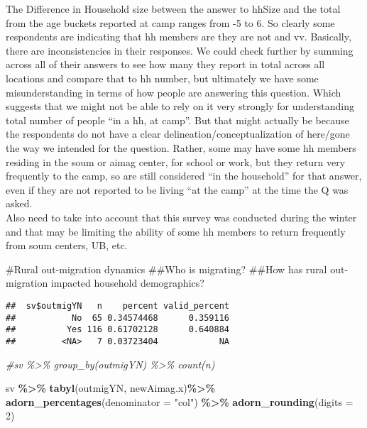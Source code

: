 \documentclass[
]{article}
\newenvironment{Shaded}{\begin{snugshade}}{\end{snugshade}}
\newcommand{\AttributeTok}[1]{\textcolor[rgb]{0.13,0.29,0.53}{#1}}
\newcommand{\CommentTok}[1]{\textcolor[rgb]{0.56,0.35,0.01}{\textit{#1}}}
\newcommand{\DecValTok}[1]{\textcolor[rgb]{0.00,0.00,0.81}{#1}}
\newcommand{\FunctionTok}[1]{\textcolor[rgb]{0.13,0.29,0.53}{\textbf{#1}}}
\newcommand{\NormalTok}[1]{#1}
\newcommand{\SpecialCharTok}[1]{\textcolor[rgb]{0.81,0.36,0.00}{\textbf{#1}}}
\newcommand{\StringTok}[1]{\textcolor[rgb]{0.31,0.60,0.02}{#1}}
\begin{document}
The Difference in Household size between the answer to hhSize and the
total from the age buckets reported at camp ranges from -5 to 6. So
clearly some respondents are indicating that hh members are they are not
and vv. Basically, there are inconsistencies in their responses. We
could check further by summing across all of their answers to see how
many they report in total across all locations and compare that to hh
number, but ultimately we have some misunderstanding in terms of how
people are answering this question. Which suggests that we might not be
able to rely on it very strongly for understanding total number of
people ``in a hh, at camp''. But that might actually be because the
respondents do not have a clear delineation/conceptualization of
here/gone the way we intended for the question. Rather, some may have
some hh members residing in the soum or aimag center, for school or
work, but they return very frequently to the camp, so are still
considered ``in the household'' for that answer, even if they are not
reported to be living ``at the camp'' at the time the Q was asked.\\
Also need to take into account that this survey was conducted during the
winter and that may be limiting the ability of some hh members to return
frequently from soum centers, UB, etc.

\#Rural out-migration dynamics \#\#Who is migrating? \#\#How has rural
out-migration impacted household demographics?

\begin{Shaded}
\end{Shaded}

\begin{verbatim}
##  sv$outmigYN   n    percent valid_percent
##           No  65 0.34574468      0.359116
##          Yes 116 0.61702128      0.640884
##         <NA>   7 0.03723404            NA
\end{verbatim}

\begin{Shaded}
\begin{Highlighting}[]
\CommentTok{\#sv \%\textgreater{}\% group\_by(outmigYN) \%\textgreater{}\% count(n)}

\NormalTok{sv }\SpecialCharTok{\%\textgreater{}\%} \FunctionTok{tabyl}\NormalTok{(outmigYN, newAimag.x)}\SpecialCharTok{\%\textgreater{}\%}
  \FunctionTok{adorn\_percentages}\NormalTok{(}\AttributeTok{denominator =} \StringTok{"col"}\NormalTok{) }\SpecialCharTok{\%\textgreater{}\%}
  \FunctionTok{adorn\_rounding}\NormalTok{(}\AttributeTok{digits =} \DecValTok{2}\NormalTok{)}
\end{Highlighting}
\end{Shaded}
\end{document}
